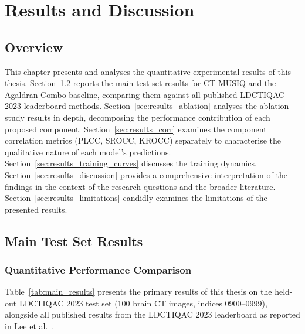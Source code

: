 
\chapter{Results and Discussion}
\label{chap:results}

\section{Overview}
\label{sec:results_overview}

This chapter presents and analyses the quantitative experimental results of this thesis.
Section~\ref{sec:results_main} reports the main test set results for CT-MUSIQ and the
Agaldran Combo baseline, comparing them against all published LDCTIQAC 2023 leaderboard
methods. Section~\ref{sec:results_ablation} analyses the ablation study results in depth,
decomposing the performance contribution of each proposed component. Section~\ref{sec:results_corr}
examines the component correlation metrics (PLCC, SROCC, KROCC) separately to characterise
the qualitative nature of each model's predictions. Section~\ref{sec:results_training_curves}
discusses the training dynamics. Section~\ref{sec:results_discussion} provides a
comprehensive interpretation of the findings in the context of the research questions and
the broader literature. Section~\ref{sec:results_limitations} candidly examines the
limitations of the presented results.


\section{Main Test Set Results}
\label{sec:results_main}

\subsection{Quantitative Performance Comparison}

Table~\ref{tab:main_results} presents the primary results of this thesis on the
held-out LDCTIQAC 2023 test set (100 brain CT images, indices 0900--0999), alongside
all published results from the LDCTIQAC 2023 leaderboard as reported in Lee et al.\
\cite{lee2025ldctiqac}.

